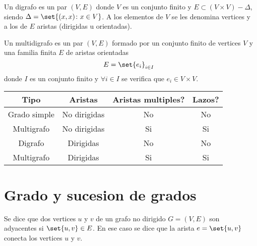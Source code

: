 \begin{definition}[Digrafo]
	Un digrafo es un par \((V,E )\) donde \(V \) es un conjunto finito y \(E \subset (V \times V ) - \Delta \), siendo \(\Delta = \set{(x,x) \colon x \in V }\). A los elementos de \(V \) se les denomina vertices y a los de \(E \) aristas (dirigidas u orientadas).
\end{definition}

\begin{definition}[Multidigrafo]
	Un multidigrafo es un par \((V,E )\) formado por un conjunto finito de vertices \(V \) y una familia finita \(E \) de aristas orientadas
	\[
		E = \set{e_i}_{i\in I }
	\]
	donde \(I \) es un conjunto finito y \(\forall i \in I \) se verifica que \(e_i \in V \times V \).
\end{definition}

\begin{table}[H]
	\centering
	\begin{tabular}{|c|c|c|c|}
		\hline
		Tipo         & Aristas      & Aristas multiples? & Lazos? \\ \hline
		\hline
		Grado simple & No dirigidas & No                 & No     \\ \hline
		Multigrafo   & No dirigidas & Si                 & Si     \\ \hline
		Digrafo      & Dirigidas    & No                 & No     \\ \hline
		Multigrafo   & Dirigidas    & Si                 & Si     \\
		\hline
	\end{tabular}
	\label{tab:label}
\end{table}


\section{Grado y sucesion de grados}
\begin{definition}
	Se dice que dos vertices \(u \) y \(v \) de un grafo no dirigido \(G = (V,E )\) son adyacentes si \(\set{u,v} \in E \). En ese caso se dice que la arista \(e = \set{u,v }\) conecta los vertices \(u \) y \(v \).
\end{definition}

